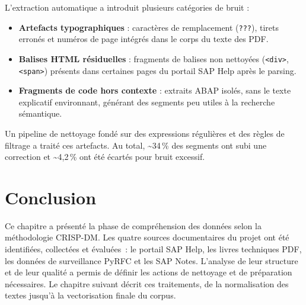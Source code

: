 L’extraction automatique a introduit plusieurs catégories de bruit :

\begin{itemize}
    \item \textbf{Artefacts typographiques} : caractères de remplacement (\texttt{???}), tirets erronés et numéros de page intégrés dans le corps du texte des PDF.
    \item \textbf{Balises HTML résiduelles} : fragments de balises non nettoyées (\texttt{<div>}, \texttt{<span>}) présents dans certaines pages du portail SAP Help après le parsing.
    \item \textbf{Fragments de code hors contexte} : extraits ABAP isolés, sans le texte explicatif environnant, générant des segments peu utiles à la recherche sémantique.
\end{itemize}

Un pipeline de nettoyage fondé sur des expressions régulières et des règles de filtrage a traité ces artefacts. Au total, \textasciitilde{}34\,\% des segments ont subi une correction et \textasciitilde{}4,2\,\% ont été écartés pour bruit excessif.

\section*{Conclusion}
Ce chapitre a présenté la phase de compréhension des données selon la méthodologie CRISP-DM. Les quatre sources documentaires du projet ont été identifiées, collectées et évaluées~: le portail SAP Help, les livres techniques PDF, les données de surveillance PyRFC et les SAP Notes. L'analyse de leur structure et de leur qualité a permis de définir les actions de nettoyage et de préparation nécessaires. Le chapitre suivant décrit ces traitements, de la normalisation des textes jusqu'à la vectorisation finale du corpus.
